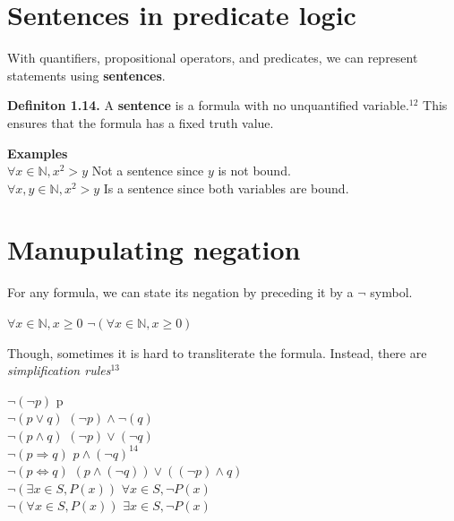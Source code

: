 \documentclass{article}
\begin{document}
\section{Sentences in predicate logic}
With quantifiers, propositional operators, and predicates, we can represent 
statements using \textbf{sentences}.

\textbf{Definiton 1.14.} A \textbf{sentence} is a formula with no unquantified 
\newline variable.$^{12}$ This ensures that the formula has a fixed truth value.

\textbf{Examples} \\
$\forall x \in \mathbb{N}, x^2 > y$ \hfill Not a sentence since $y$ is not bound. \\
$\forall x, y \in \mathbb{N}, x^2 > y$ \hfill Is a sentence since both variables are bound. 

\section{Manupulating negation}
For any formula, we can state its negation by preceding it by a $\neg$ symbol.

$\forall x \in \mathbb{N}, x \geq 0$ \hfill  $\neg(\forall x \in \mathbb{N}, x \geq 0)$

Though, sometimes it is hard to transliterate the formula. Instead, there are 
\textit{simplification rules}$^{13}$

$\neg(\neg p)$ \hfill p \\
$\neg(p \lor q)$ \hfill $(\neg p) \land \neg(q)$ \\
$\neg(p \land q)$ \hfill $(\neg p) \lor (\neg q)$ \\
$\neg(p \Rightarrow q)$ \hfill $p \land (\neg q) ^{14}$ \\
$\neg(p \Leftrightarrow q)$ \hfill $(p \land (\neg q)) \lor ((\neg p)\land q)$ \\
$\neg(\exists x \in S, P(x))$ \hfill $\forall x \in S, \neg P(x)$ \\
$\neg(\forall x \in S, P(x))$ \hfill $\exists x \in S, \neg P(x)$ 

\end{document}
